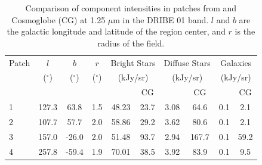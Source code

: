 \documentclass{aa}
\begin{document}
\begin{table}
    \centering
    \begin{tabular}{l c c c c c c c c c}
    \hline
    \hline
     Patch & $l$ & $b$ & $r$ & \multicolumn{2}{c}{Bright Stars} & \multicolumn{2}{c}{Diffuse Stars} & \multicolumn{2}{c}{Galaxies} \\ 
     & ($^{\circ}$) & ($^{\circ}$) & ($^{\circ}$) & \multicolumn{2}{c}{(kJy/sr)} & \multicolumn{2}{c}{(kJy/sr)} & \multicolumn{2}{c}{(kJy/sr)} \\
          &  & & & \cite{DIRBE2mass} & CG & \cite{DIRBE2mass} & CG & \cite{DIRBE2mass} & CG\\
    
     \hline
     1 \rule{0pt}{2ex} & 127.3 & 63.8  & 1.5 & 48.23 & 23.7 & 3.08 & 64.6 & 0.1 & 2.1\\
     2 & 107.7 & 57.7 & 2.0 & 58.86 & 29.2 & 3.62 & 80.6 & 0.1 & 2.1 \\
     3 & 157.0 & -26.0 & 2.0 & 51.48 & 93.7 & 2.94 & 167.7 & 0.1 & 59.2 \\
     4 & 257.8 & -59.4 & 1.9 & 70.01 & 38.5 & 3.92 & 83.9 & 0.1 & 9.5\\
     \hline
    \end{tabular}
    \caption{Comparison of component intensities in patches from \cite{DIRBE2mass} and Cosmoglobe (CG) at 1.25 $\mu$m in the DRIBE 01 band. $l$ and $b$ are the galactic longitude and latitude of the region center, and $r$ is the radius of the field.}
    \label{tab:2mass}
\end{table}
\end{document}
